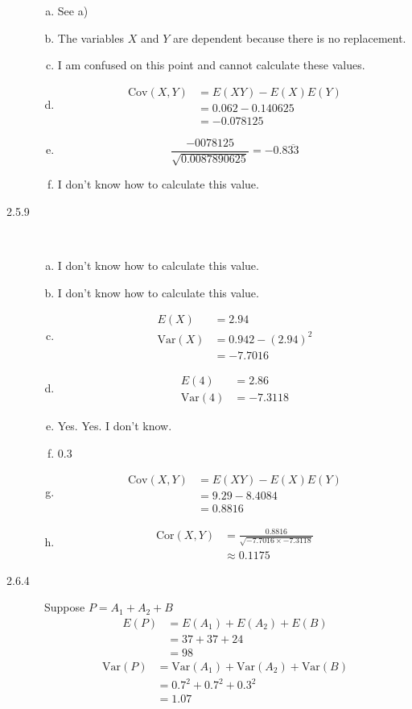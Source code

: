 \documentclass[letterpaper,10pt]{article}
\begin{document}
\begin{description}
\begin{enumerate}[a)]
\item See a)
\item The variables $X$ and $Y$ are dependent because there is no replacement.
\item I am confused on this point and cannot calculate these values.
\item \begin{align*}
\mbox{Cov}(X, Y) &= E(XY) - E(X)E(Y) \\
&= 0.062 - 0.140625 \\
&= -0.078125
\end{align*}
\item \[\frac{-0078125}{\sqrt{0.0087890625}}=-0.8\overline{33}\]
\item I don't know how to calculate this value.
\end{enumerate}

\item[2.5.9] \ 
\begin{enumerate}[a)]
\item I don't know how to calculate this value.
\item I don't know how to calculate this value.
\item \begin{align*}E(X) &= 2.94\\ \mbox{Var}(X) &= 0.942 - (2.94)^{2}\\ &= -7.7016\end{align*}
\item \begin{align*}E(4) &= 2.86\\ \mbox{Var}(4) &= -7.3118\end{align*}
\item Yes. Yes. I don't know.
\item 0.3
\item \begin{align*}
\mbox{Cov}(X, Y) &= E(XY) - E(X)E(Y) \\
&= 9.29 - 8.4084 \\
&= 0.8816
\end{align*}
\item \begin{align*}
\mbox{Cor}(X, Y) &= \frac{0.8816}{\sqrt{-7.7016\times -7.3118}} \\
&\approx 0.1175
\end{align*}
\end{enumerate}

\item[2.6.4] \ 
Suppose $P=A_{1}+A_{2}+B$
\begin{align*}
E(P) &= E(A_{1})+E(A_{2})+E(B) \\
&= 37+37+24 \\
&= 98
\end{align*}
\begin{align*}
\mbox{Var}(P) &= \mbox{Var}(A_{1})+\mbox{Var}(A_{2})+\mbox{Var}(B) \\
&= 0.7^{2}+0.7^{2}+0.3^{2} \\
&= 1.07
\end{align*}


\end{description}
\end{document}
